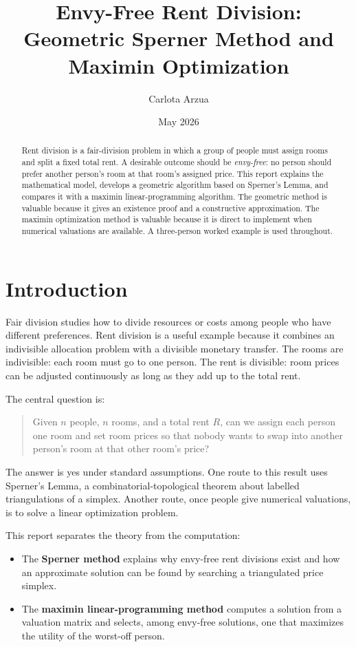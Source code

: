 \documentclass[11pt]{article}
\title{Envy-Free Rent Division:\\ Geometric Sperner Method and Maximin Optimization}
\author{Carlota Arzua}
\date{May 2026}
\begin{document}
\maketitle

\begin{abstract}
Rent division is a fair-division problem in which a group of people must assign rooms and split a fixed total rent. A desirable outcome should be \emph{envy-free}: no person should prefer another person's room at that room's assigned price. This report explains the mathematical model, develops a geometric algorithm based on Sperner's Lemma, and compares it with a maximin linear-programming algorithm. The geometric method is valuable because it gives an existence proof and a constructive approximation. The maximin optimization method is valuable because it is direct to implement when numerical valuations are available. A three-person worked example is used throughout.
\end{abstract}

\section{Introduction}

Fair division studies how to divide resources or costs among people who have different preferences. Rent division is a useful example because it combines an indivisible allocation problem with a divisible monetary transfer. The rooms are indivisible: each room must go to one person. The rent is divisible: room prices can be adjusted continuously as long as they add up to the total rent.

The central question is:

\begin{quote}
Given $n$ people, $n$ rooms, and a total rent $R$, can we assign each person one room and set room prices so that nobody wants to swap into another person's room at that other room's price?
\end{quote}

The answer is yes under standard assumptions. One route to this result uses Sperner's Lemma, a combinatorial-topological theorem about labelled triangulations of a simplex. Another route, once people give numerical valuations, is to solve a linear optimization problem.

This report separates the theory from the computation:

\begin{itemize}
    \item The \textbf{Sperner method} explains why envy-free rent divisions exist and how an approximate solution can be found by searching a triangulated price simplex.
    \item The \textbf{maximin linear-programming method} computes a solution from a valuation matrix and selects, among envy-free solutions, one that maximizes the utility of the worst-off person.
\end{itemize}
\end{document}
